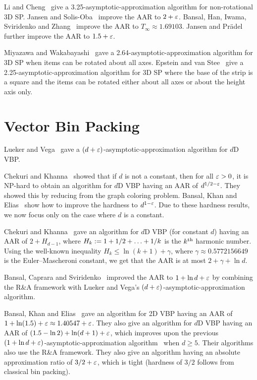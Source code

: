 Li and Cheng~\cite{li1990three} give a 3.25-asymptotic-approximation
algorithm for non-rotational 3D SP.
Jansen and Solis-Oba~\cite{jansen2006asymptotic} improve the AAR to $2+\varepsilon$.
Bansal, Han, Iwama, Sviridenko and Zhang~\cite{bansal2007harmonic}
improve the AAR to $T_{\infty} \approx 1.69103$.
Jansen and Pr\"adel~\cite{jansen2014new} further improve the AAR to $1.5 + \varepsilon$.

Miyazawa and Wakabayashi~\cite{miyazawa2009three} gave a
2.64-asymptotic-approximation algorithm for 3D SP
when items can be rotated about all axes.
Epstein and van Stee~\cite{epstein2006side} give a
2.25-asymptotic-approximation algorithm for 3D SP
where the base of the strip is a square
and the items can be rotated either about all axes
or about the height axis only.

\section{Vector Bin Packing}

Lueker and Vega~\cite{bp-aptas} gave a $(d+\varepsilon)$-asymptotic-approximation
algorithm for $d$D VBP.

Chekuri and Khanna~\cite{chekuri-khanna-vbp} showed that
if $d$ is not a constant, then for all $\varepsilon > 0$, it is NP-hard to
obtain an algorithm for $d$D VBP having an AAR of $d^{1/2-\varepsilon}$.
They showed this by reducing from the graph coloring problem.
Bansal, Khan and Elias~\cite{bansal2016improved}
show how to improve the hardness to $d^{1-\varepsilon}$.
Due to these hardness results, we now focus only on the case where $d$ is a constant.

Chekuri and Khanna~\cite{chekuri-khanna-vbp} gave an algorithm for $d$D VBP
(for constant $d$) having an AAR of $2 + H_{d-1}$, where
$H_k := 1 + 1/2 + \ldots + 1/k$ is the $k^{\textrm{th}}$ harmonic number.
Using the well-known inequality $H_k \le \ln(k+1) + \gamma$,
where $\gamma \approx 0.5772156649$ is the Euler–Mascheroni constant,
we get that the AAR is at most $2 + \gamma + \ln d$.

Bansal, Caprara and Sviridenko~\cite{rna} improved the AAR to
$1 + \ln d + \varepsilon$ by combining the R\&A framework with Lueker and Vega's
$(d+\varepsilon)$-asymptotic-approximation algorithm.

Bansal, Khan and Elias~\cite{bansal2016improved} gave an algorithm for 2D VBP
having an AAR of $1 + \ln(1.5) + \varepsilon \approx 1.40547 + \varepsilon$.
They also give an algorithm for $d$D VBP having an AAR of
$(1.5 - \ln 2) + \ln(d+1) + \varepsilon$, which improves upon the previous
$(1 + \ln d + \varepsilon)$-asymptotic-approximation algorithm~\cite{rna} when $d \ge 5$.
Their algorithms also use the R\&A framework.
They also give an algorithm having an absolute approximation ratio of $3/2 + \varepsilon$,
which is tight (hardness of $3/2$ follows from classical bin packing).

